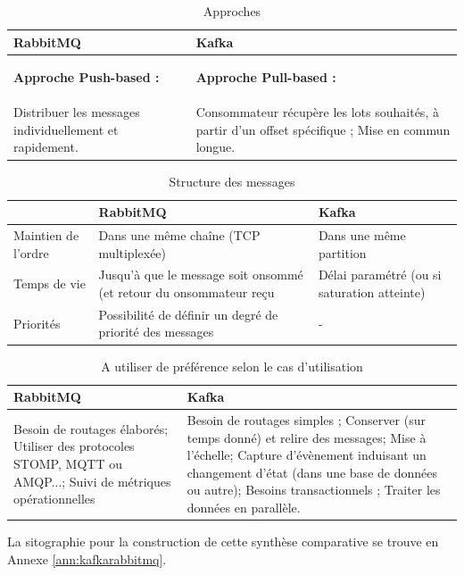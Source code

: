 \documentclass{article}
\begin{document}
			\medskip
			\begin{table}
				\begin{tabular}{|p{8cm}|p{8cm}|}
				\hline
				\rowcolor{lightgray} RabbitMQ & Kafka\\\hline
				\begin{center} \textbf{Approche Push-based :}\end{center} & \begin{center} \textbf{Approche Pull-based :}\end{center}\\\hline
				Distribuer les messages individuellement et rapidement. & Consommateur récupère les lots souhaités, à partir d’un offset spécifique ; Mise en commun longue.\\\hline
				\end{tabular}
				\caption{Approches}
				\label{tab:comparatifapp}
			\end{table}
			\medskip
			\begin{table}
				\begin{tabular}{|p{4cm}|p{6cm}|p{6cm}|}
					\hline
					\rowcolor{lightgray} & RabbitMQ & Kafka\\\hline
					Maintien de l'ordre & Dans une même chaîne (TCP multiplexée) & Dans une même partition\\\hline
					Temps de vie & Jusqu’à que le message soit onsommé (et retour du onsommateur reçu & Délai paramétré (ou si saturation atteinte)\\\hline
					Priorités & Possibilité de définir un degré de priorité des messages & - \\\hline
				\end{tabular}
				\caption{Structure des messages}
				\label{tab:comparatifmess}
			\end{table}
			\medskip
			\begin{table}
				\begin{tabular}{|p{8cm}|p{8cm}|}
				\hline
				\rowcolor{lightgray} RabbitMQ & Kafka\\\hline
				Besoin de routages élaborés; Utiliser des protocoles STOMP, MQTT ou AMQP...; Suivi de métriques opérationnelles & Besoin de routages simples ; Conserver (sur temps donné) et relire des messages; Mise à l’échelle; Capture d’évènement induisant un changement d’état (dans une base de données ou autre); Besoins transactionnels ; Traiter les données en parallèle.\\\hline
				\end{tabular}
				\caption{A utiliser de préférence selon le cas d'utilisation}
				\label{tab:comparatifpref}
			\end{table}
			La sitographie pour la construction de cette synthèse comparative se trouve en Annexe \ref{ann:kafkarabbitmq}.
\end{document}

